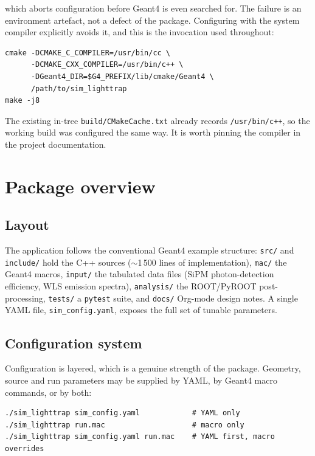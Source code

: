 \documentclass[a4paper,11pt]{article}
\begin{document}
which aborts configuration before Geant4 is even searched for. The failure is an
environment artefact, not a defect of the package. Configuring with the system
compiler explicitly avoids it, and this is the invocation used throughout:

\begin{lstlisting}
cmake -DCMAKE_C_COMPILER=/usr/bin/cc \
      -DCMAKE_CXX_COMPILER=/usr/bin/c++ \
      -DGeant4_DIR=$G4_PREFIX/lib/cmake/Geant4 \
      /path/to/sim_lighttrap
make -j8
\end{lstlisting}

The existing in-tree \texttt{build/CMakeCache.txt} already records
\texttt{/usr/bin/c++}, so the working build was configured the same way. It is
worth pinning the compiler in the project documentation.

\section{Package overview}
\label{sec:package}

\subsection{Layout}

The application follows the conventional Geant4 example structure:
\texttt{src/} and \texttt{include/} hold the C++ sources
($\sim$1\,500 lines of implementation), \texttt{mac/} the Geant4 macros,
\texttt{input/} the tabulated data files (SiPM photon-detection efficiency, WLS
emission spectra), \texttt{analysis/} the ROOT/PyROOT post-processing,
\texttt{tests/} a \texttt{pytest} suite, and \texttt{docs/} Org-mode design
notes. A single YAML file, \texttt{sim\_config.yaml}, exposes the full set of
tunable parameters.

\subsection{Configuration system}

Configuration is layered, which is a genuine strength of the package. Geometry,
source and run parameters may be supplied by YAML, by Geant4 macro commands, or
by both:

\begin{lstlisting}
./sim_lighttrap sim_config.yaml            # YAML only
./sim_lighttrap run.mac                    # macro only
./sim_lighttrap sim_config.yaml run.mac    # YAML first, macro overrides
\end{lstlisting}
\end{document}
